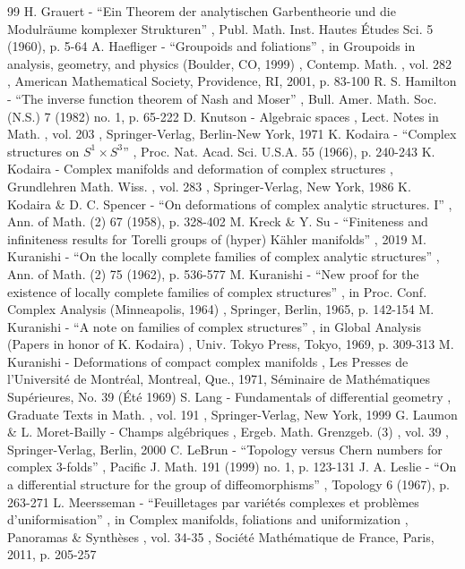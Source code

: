 \documentclass[10pt]{amsart}
\theoremstyle{plain}
\theoremstyle{definition}
\theoremstyle{remark}
\numberwithin{equation}{section}
\begin{document}
\begin{thebibliography}{99}
 H. Grauert - “Ein Theorem der analytischen Garbentheorie und die Modulräume komplexer Strukturen” , Publ. Math. Inst. Hautes Études Sci. 5 (1960), p. 5-64
 A. Haefliger - “Groupoids and foliations” , in Groupoids in analysis, geometry, and physics (Boulder, CO, 1999) , Contemp. Math. , vol. 282 , American Mathematical Society, Providence, RI, 2001, p. 83-100
 R. S. Hamilton - “The inverse function theorem of Nash and Moser” , Bull. Amer. Math. Soc. (N.S.) 7 (1982) no. 1, p. 65-222
 D. Knutson - Algebraic spaces , Lect. Notes in Math. , vol. 203 , Springer-Verlag, Berlin-New York, 1971
 K. Kodaira - “Complex structures on $S^{1}\times S^{3}$” , Proc. Nat. Acad. Sci. U.S.A. 55 (1966), p. 240-243
 K. Kodaira - Complex manifolds and deformation of complex structures , Grundlehren Math. Wiss. , vol. 283 , Springer-Verlag, New York, 1986
 K. Kodaira \& D. C. Spencer - “On deformations of complex analytic structures. I” , Ann. of Math. (2) 67 (1958), p. 328-402
 M. Kreck \& Y. Su - “Finiteness and infiniteness results for Torelli groups of (hyper) Kähler manifolds” , 2019
 M. Kuranishi - “On the locally complete families of complex analytic structures” , Ann. of Math. (2) 75 (1962), p. 536-577
 M. Kuranishi - “New proof for the existence of locally complete families of complex structures” , in Proc. Conf. Complex Analysis (Minneapolis, 1964) , Springer, Berlin, 1965, p. 142-154
 M. Kuranishi - “A note on families of complex structures” , in Global Analysis (Papers in honor of K. Kodaira) , Univ. Tokyo Press, Tokyo, 1969, p. 309-313
 M. Kuranishi - Deformations of compact complex manifolds , Les Presses de l’Université de Montréal, Montreal, Que., 1971, Séminaire de Mathématiques Supérieures, No. 39 (Été 1969)
 S. Lang - Fundamentals of differential geometry , Graduate Texts in Math. , vol. 191 , Springer-Verlag, New York, 1999
 G. Laumon \& L. Moret-Bailly - Champs algébriques , Ergeb. Math. Grenzgeb. (3) , vol. 39 , Springer-Verlag, Berlin, 2000
 C. LeBrun - “Topology versus Chern numbers for complex $3$-folds” , Pacific J. Math. 191 (1999) no. 1, p. 123-131
 J. A. Leslie - “On a differential structure for the group of diffeomorphisms” , Topology 6 (1967), p. 263-271
 L. Meersseman - “Feuilletages par variétés complexes et problèmes d’uniformisation” , in Complex manifolds, foliations and uniformization , Panoramas \& Synthèses , vol. 34-35 , Société Mathématique de France, Paris, 2011, p. 205-257

\end{thebibliography}
\end{document}
